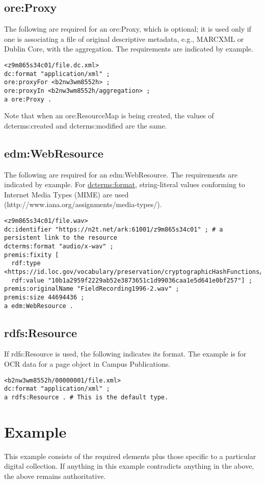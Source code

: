 \documentclass[11pt]{article}
\begin{document}
\subsection{ore:Proxy}

The following are required for an ore:Proxy, which is optional; it is used only if one is associating a file of original descriptive metadata, e.g., MARCXML or Dublin Core, with the aggregation. The requirements are indicated by example. 

\begin{verbatim}
<z9m865s34c01/file.dc.xml>
dc:format "application/xml" ;
ore:proxyFor <b2nw3wm8552h> ;
ore:proxyIn <b2nw3wm8552h/aggregation> ;
a ore:Proxy .
\end{verbatim}

Note that when an ore:ResourceMap is being created, the values of dcterms:created and dcterms:modified are the same.

\subsection{edm:WebResource}

The following are required for an edm:WebResource. The requirements are indicated by example. For \underline{dcterms:format}, string-literal values conforming to Internet Media Types (MIME) are used (http://www.iana.org/assignments/media-types/).

\begin{verbatim}
<z9m865s34c01/file.wav> 
dc:identifier "https://n2t.net/ark:61001/z9m865s34c01" ; # a persistent link to the resource
dcterms:format "audio/x-wav" ;
premis:fixity [
  rdf:type <https://id.loc.gov/vocabulary/preservation/cryptographicHashFunctions/sha512>;
  rdf:value "10b1a2959f2229ab52e3873651c1d99036caa1e5d641e0bf257"] ;
premis:originalName "FieldRecording1996-2.wav" ;
premis:size 44694436 ;
a edm:WebResource .
\end{verbatim}

\subsection{rdfs:Resource}

If rdfs:Resource is used, the following indicates its format. The example is for OCR data for a page object in Campus Publications.

\begin{verbatim}
<b2nw3wm8552h/00000001/file.xml>
dc:format "application/xml" ;
a rdfs:Resource . # This is the default type. 
\end{verbatim}

\pagebreak[4]
\section{Example}
This example consists of the required elements plus those specific to a particular digital collection. If anything in this example contradicts anything in the above, the above remains authoritative.


\end{document}
